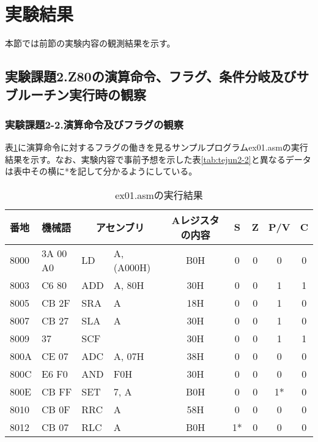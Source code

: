 \documentclass[11pt,a4j]{jsarticle}
\begin{document}
  
  \clearpage
  
  
 \section{実験結果}
  本節では前節の実験内容の観測結果を示す。
  \subsection{実験課題2.Z80の演算命令、フラグ、条件分岐及びサブルーチン実行時の観察}
   \subsubsection{実験課題2-2.演算命令及びフラグの観察}
   
   表\ref{tab:kekka2-2}に演算命令に対するフラグの働きを見るサンプルプログラムex01.asmの実行結果を示す。なお、実験内容で事前予想を示した表\ref{tab:tejun2-2}と異なるデータは表中その横に*を記して分かるようにしている。
   
   \begin{table}[htb]
  \begin{center}
    \caption{ex01.asmの実行結果}
    \begin{tabular}{|l|l|ll|c|c|c|c|c|} \hline
番地 & 機械語 & \multicolumn{2}{|c|}{アセンブリ} & Aレジスタの内容 & S & Z & P/V & C \\ \hline
8000 & 3A 00 A0 & LD & A, (A000H) & B0H & 0 & 0 & 0 & 0 \\ \hline
8003 & C6 80 & ADD & A, 80H & 30H & 0 & 0 & 1 & 1 \\ \hline
8005 & CB 2F & SRA & A & 18H & 0 & 0 & 1 & 0 \\ \hline
8007 & CB 27 & SLA & A & 30H & 0 & 0 & 1 & 0 \\ \hline
8009 & 37 & SCF &  & 30H & 0 & 0 & 1 & 1 \\ \hline
800A & CE 07 & ADC & A, 07H & 38H & 0 & 0 & 0 & 0 \\ \hline
800C & E6 F0 & AND & F0H & 30H & 0 & 0 & 0 & 0 \\ \hline
800E & CB FF & SET & 7, A & B0H & 0 & 0 & 1* & 0 \\ \hline
8010 & CB 0F & RRC & A & 58H & 0 & 0 & 0 & 0 \\ \hline
8012 & CB 07 & RLC & A & B0H & 1* & 0 & 0 & 0 \\ \hline
    \end{tabular}
    \label{tab:kekka2-2}
  \end{center}
 \end{table}
   
\end{document}
